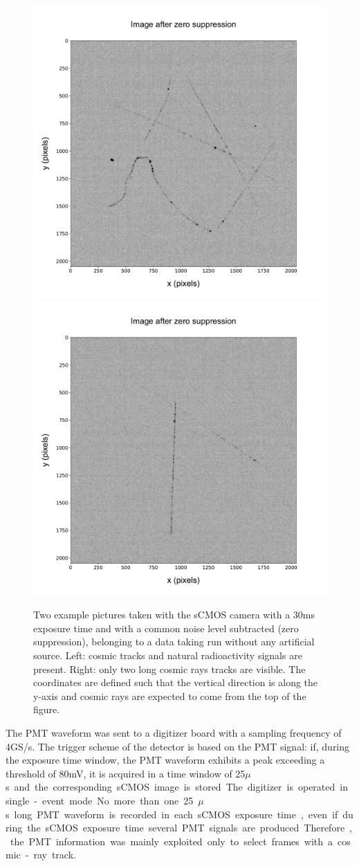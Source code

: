 \documentclass[12pt]{iopart}
\begin{document}
\begin{figure}[ht]
  \begin{center}
    \includegraphics[width=0.49\linewidth]{figures/pic_run02317_ev8_oriIma_paper}
    \includegraphics[width=0.49\linewidth]{figures/pic_run02156_ev527_oriIma_paper}
    \caption{Two example pictures taken with the sCMOS camera with a
      30\unit{ms} exposure time and with a common noise level
      subtracted (zero suppression), belonging to a data taking run
      without any artificial source. Left: cosmic tracks and natural
      radioactivity signals are present. Right: only two long cosmic
      rays tracks are visible. The coordinates are defined such that
      the vertical direction is along the y-axis and cosmic rays are
      expected to come from the top of the figure.
      \label{fig:typicalimage1}}
  \end{center}
\end{figure}

The PMT waveform was sent to a digitizer board with a sampling
frequency of 4\unit{GS/s}. The trigger scheme of the detector is based
on the PMT signal: if, during the exposure time window, the PMT
waveform exhibits a peak exceeding a threshold of 80\unit{mV}, it is
acquired in a time window of 25\unit{$\mu$s} and the corresponding
sCMOS image is stored.  The digitizer is operated in single-event
mode. No more than one 25\unit{$\mu$s} long PMT waveform is recorded
in each sCMOS exposure time, even if during the sCMOS exposure time
several PMT signals are produced.  Therefore, the PMT information was
mainly exploited only to select frames with a cosmic-ray track.
\end{document}
